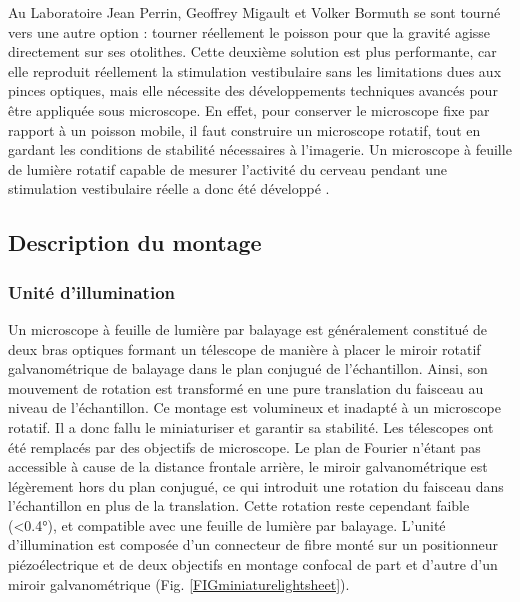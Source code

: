 Au Laboratoire Jean Perrin, Geoffrey Migault et Volker Bormuth se sont tourné vers une autre option : tourner réellement le poisson pour que la gravité agisse directement sur ses otolithes.
Cette deuxième solution est plus performante, car elle reproduit réellement la stimulation vestibulaire sans les limitations dues aux pinces optiques, mais elle nécessite des développements techniques avancés pour être appliquée sous microscope. En effet, pour conserver le microscope fixe par rapport à un poisson mobile, il faut construire un microscope rotatif, tout en gardant les conditions de stabilité nécessaires à l'imagerie. Un microscope à feuille de lumière rotatif capable de mesurer l'activité du cerveau pendant une stimulation vestibulaire réelle a donc été développé \cite{migault_whole-brain_2018}.

\subsection{Description du montage}

\subsubsection{Unité d'illumination}

Un microscope à feuille de lumière par balayage est généralement constitué de deux bras optiques formant un télescope de manière à placer le miroir rotatif galvanométrique de balayage dans le plan conjugué de l'échantillon. Ainsi, son mouvement de rotation est transformé en une pure translation du faisceau au niveau de l'échantillon. Ce montage est volumineux et inadapté à un microscope rotatif. Il a donc fallu le miniaturiser et garantir sa stabilité. Les télescopes ont été remplacés par des objectifs de microscope. Le plan de Fourier n'étant pas accessible à cause de la distance frontale arrière, le miroir galvanométrique est légèrement hors du plan conjugué, ce qui introduit une rotation du faisceau dans l'échantillon en plus de la translation. Cette rotation reste cependant faible (<0.4°), et compatible avec une feuille de lumière par balayage.  
L'unité d'illumination est composée d'un connecteur de fibre monté sur un positionneur piézoélectrique et de deux objectifs en montage confocal de part et d'autre d'un miroir galvanométrique (Fig. \ref{FIGminiaturelightsheet}).

